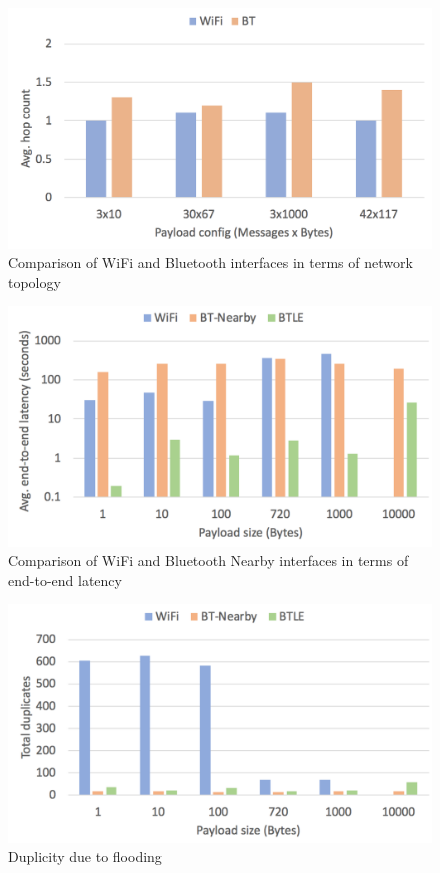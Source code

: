 \documentclass[conference]{IEEEtran}
\begin{document}
\begin{figure}[htbp]
\centerline{\includegraphics[width=\columnwidth]{figs/variety_hops}}
\caption{Comparison of WiFi and Bluetooth interfaces in terms of
  network topology}
\label{fig:variety_hops}
\end{figure}


\begin{figure}[htbp]
\centerline{\includegraphics[width=\columnwidth]{figs/e2e_latency}}
\caption{Comparison of WiFi and Bluetooth Nearby interfaces in terms
  of end-to-end latency}
\label{fig:e2e}
\end{figure}

\begin{figure}[htbp]
\centerline{\includegraphics[width=\columnwidth]{figs/duplicates}}
\caption{Duplicity due to flooding}
\label{fig:dup}
\end{figure}
\end{document}
